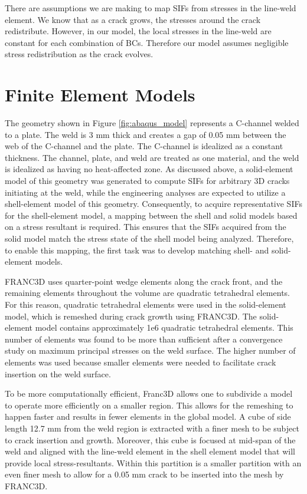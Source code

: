 There are assumptions we are making to map SIFs from stresses in the line-weld element. We know that as a crack grows, the stresses around the crack redistribute. However, in our model, the local stresses in the line-weld are constant for each combination of BCs. Therefore our model assumes negligible stress redistribution as the crack evolves.

\section{Finite Element Models} \label{fem}

The geometry shown in Figure \ref{fig:abaqus_model} represents a C-channel
welded to a plate. The weld is 3 mm thick and creates a gap of 0.05 mm between
the web of the C-channel and the plate. The C-channel is idealized as a constant
thickness. The channel, plate, and weld are treated as one material, and the weld
is idealized as having no heat-affected zone. As discussed above, a
solid-element model of this geometry was generated to compute SIFs for arbitrary
3D cracks initiating at the weld, while the engineering analyses are expected to
utilize a shell-element model of this geometry.  Consequently, to acquire
representative SIFs for the shell-element model, a mapping between the shell and
solid models based on a stress resultant is required.  This ensures that
the SIFs acquired from the solid model match the stress state of the shell model
being analyzed.  Therefore, to enable this mapping, the first task was to develop
matching shell- and solid-element models. 

FRANC3D uses quarter-point wedge elements along the crack front, and the
remaining elements throughout the volume are quadratic tetrahedral elements. For
this reason, quadratic tetrahedral elements were used in the solid-element
model, which is remeshed during crack growth using FRANC3D. The solid-element
model contains approximately 1e6 quadratic tetrahedral elements.  This number of
elements was found to be more than sufficient after a convergence study on
maximum principal stresses on the weld surface. The higher number of elements
was used because smaller elements were needed to facilitate crack insertion on
the weld surface.  

To be more computationally efficient, Franc3D allows one to subdivide a model to
operate more efficiently on a smaller region. This allows for the remeshing to
happen faster and results in fewer elements in the global model. A cube of
side length 12.7 mm from the weld region is extracted with a finer mesh to be
subject to crack insertion and growth. Moreover, this cube is focused at
mid-span of the weld and aligned with the line-weld element in the shell element
model that will provide local stress-resultants. Within this partition is a
smaller partition with an even finer mesh to allow for a 0.05 mm crack to be
inserted into the mesh by FRANC3D.

